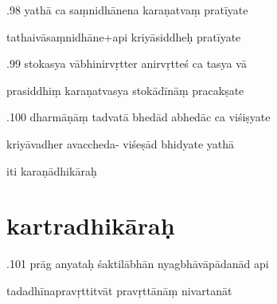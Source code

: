 \documentclass[article,12pt,a4paper]{memoir}%
\newcounter{parCount}
\begin{document}
	  
	  \pstart {}.98 yathā ca saṃnidhānena karaṇatvaṃ pratīyate 
	{}
	\pend%
      

	  
	  \pstart \leavevmode%
	tathaivāsaṃnidhāne+api kriyāsiddheḥ pratīyate 
	{}
	\pend%
      

	  
	  \pstart {}.99 stokasya vābhinirvṛtter anirvṛtteś ca tasya vā 
	{}
	\pend%
      

	  
	  \pstart \leavevmode%
	prasiddhiṃ karaṇatvasya stokādīnāṃ pracakṣate 
	{}
	\pend%
      

	  
	  \pstart {}.100 dharmāṇāṃ tadvatā bhedād abhedāc ca viśiṣyate 
	{}
	\pend%
      

	  
	  \pstart \leavevmode%
	kriyāvadher avaccheda- viśeṣād bhidyate yathā 
	{}
	\pend%
      

	  
	  \pstart \leavevmode%
	iti karaṇādhikāraḥ
	{}
	\pend%
      
	  
	
\chapter[{kartradhikāraḥ}][{kartradhikāraḥ}]{ kartradhikāraḥ}

	  
	  \pstart {}.101 prāg anyataḥ śaktilābhān nyagbhāvāpādanād api 
	{}
	\pend%
      

	  
	  \pstart \leavevmode%
	tadadhīnapravṛttitvāt pravṛttānāṃ nivartanāt 
	{}
	\pend%
      
\end{document}
